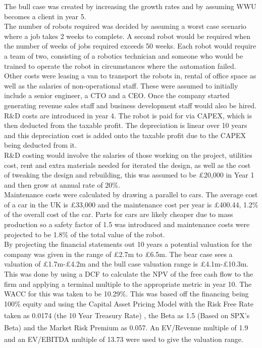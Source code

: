 \documentclass[11pt]{article}		%
\newcommand{\supercite}[1]{\textsuperscript{\cite{#1}}}		%
\begin{document}
			    The bull case was created by increasing the growth rates and by assuming WWU becomes a client in year 5.
			    \\
			    The number of robots required was decided by assuming a worst case scenario where a job takes 2 weeks to complete. A second robot would be required when the number of weeks of jobs required exceeds 50 weeks. Each robot would require a team of two, consisting of a robotics technician and someone who would be trained to operate the robot in circumstances where the automation failed.
			    \\
			    Other costs were leasing a van to transport the robots in, rental of office space as well as the salaries of non-operational staff. These were assumed to initially include a senior engineer, a CTO and a CEO. Once the company started generating revenue sales staff and business development staff would also be hired. R\&D costs are introduced in year 4. The robot is paid for via CAPEX, which is then deducted from the taxable profit. The depreciation is linear over 10 years and this depreciation cost is added onto the taxable profit due to the CAPEX being deducted from it.
			    \\
			    R\&D costing would involve the salaries of those working on the project, utilities cost, rent and extra materials needed for iterated the design, as well as the cost of tweaking the design and rebuilding, this was assumed to be £20,000 in Year 1 and then grow at annual rate of 20\%. 
			    \\
			    Maintenance costs were calculated by drawing a parallel to cars. The average cost of a car in the UK is £33,000 and the maintenance cost per year is £400.44, 1.2\% of the overall cost of the car. Parts for cars are likely cheaper due to mass production so a safety factor of 1.5 was introduced and maintenance costs were projected to be 1.8\% of the total value of the robot.
			    \\
			    By projecting the financial statements out 10 years a potential valuation for the company was given in the range of £2.7m to £6.5m. The bear case sees a valuation of £1.7m-£4.2m and the bull case valuation range is £4.1m-£10.3m.  This was done by using a DCF to calculate the NPV of the free cash flow to the firm and applying a terminal multiple to the appropriate metric in year 10. The WACC for this was taken to be 10.29\%. This was based off the financing being 100\% equity and using the Capital Asset Pricing Model with the Risk Free Rate taken as 0.0174 (the 10 Year Treasury Rate) \supercite{Treasury}, the Beta as 1.5 (Based on SPX's Beta)\supercite{SPX_Beta} and the Market Risk Premium as 0.057\supercite{Risk_Premium}. An EV/Revenue multiple of 1.9 and an EV/EBITDA multiple of 13.73\supercite{Robo} were used to give the valuation range.
			   
\end{document}
